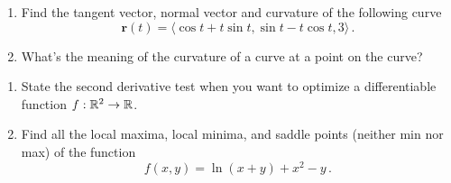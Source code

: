 \documentclass[12pt]{article}
\begin{document}
\newpage
\begin{problem}
    \begin{enumerate}
        \item Find the tangent vector, normal vector and curvature of the following curve
    \begin{equation*}
        \textbf{r}(t) = \langle \cos t + t \sin t, \sin t - t\cos t, 3 \rangle \,.
    \end{equation*}
    \item What's the meaning of the curvature of a curve at a point on the curve?
    \end{enumerate}

\end{problem}

\newpage

\begin{problem}
    \begin{enumerate}
        \item State the second derivative test when you want to optimize a differentiable function $f:\mathbb{R}^2 \to \mathbb{R}$.
        \item Find all the local maxima, local minima, and saddle points (neither min nor max) of the function
    \begin{equation*}
        f(x,y) = \ln(x+y) + x^2 - y \,.
    \end{equation*}
    \end{enumerate}
\end{problem}
%
\end{document}
